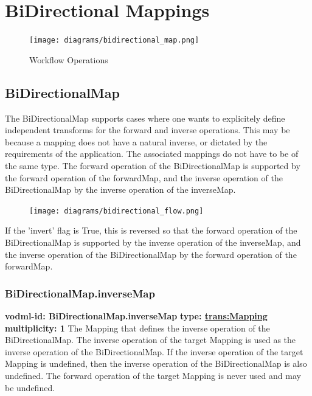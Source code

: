 \pagebreak
\section{BiDirectional Mappings}

  \begin{figure}[h]
  \begin{center}
    \texttt{[image: diagrams/bidirectional\_map.png]}
    \caption{Workflow Operations}\label{fig:BiDirMaps}
  \end{center}
  \end{figure}

  \subsection{BiDirectionalMap}
  \label{sect:BiDirectionalMap}
    The BiDirectionalMap supports cases where one wants to explicitely define independent transforms for the forward and inverse operations. This may be because a mapping does not have a natural inverse, or dictated by the requirements of the application. The associated mappings do not have to be of the same type. The forward operation of the BiDirectionalMap is supported by the forward operation of the forwardMap, and the inverse operation of the BiDirectionalMap by the inverse operation of the inverseMap.

  \begin{figure}[h]
  \begin{center}
    \texttt{[image: diagrams/bidirectional\_flow.png]}
  \end{center}
  \end{figure}

 If the 'invert' flag is True, this is reversed so that the forward operation of the BiDirectionalMap is supported by the inverse operation of the inverseMap, and the inverse operation of the BiDirectionalMap by the forward operation of the forwardMap.

    \subsubsection{BiDirectionalMap.inverseMap}
      \textbf{vodml-id: BiDirectionalMap.inverseMap} \newline
      \textbf{type: \hyperref[sect:Mapping]{trans:Mapping}} \newline
      \textbf{multiplicity: 1} \newline 
      The Mapping that defines the inverse operation of the BiDirectionalMap. The inverse operation of the target Mapping is used as the inverse operation of the BiDirectionalMap. If the inverse operation of the target Mapping is undefined, then the inverse operation of the BiDirectionalMap is also undefined. The forward operation of the target Mapping is never used and may be undefined.

